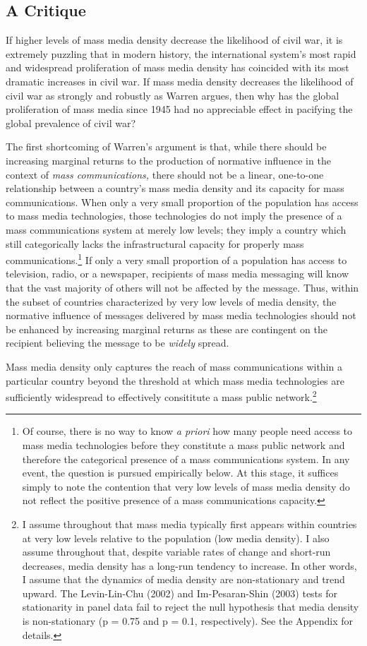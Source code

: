 \documentclass[11pt,article,oneside]{memoir}
\begin{document}
\subsection{A Critique}\label{a-critique}

If higher levels of mass media density decrease the likelihood of civil
war, it is extremely puzzling that in modern history, the international
system's most rapid and widespread proliferation of mass media density
has coincided with its most dramatic increases in civil war. If mass
media density decreases the likelihood of civil war as strongly and
robustly as Warren argues, then why has the global proliferation of mass
media since 1945 had no appreciable effect in pacifying the global
prevalence of civil war?

The first shortcoming of Warren's argument is that, while there should
be increasing marginal returns to the production of normative influence
in the context of \emph{mass communications,} there should not be a
linear, one-to-one relationship between a country's mass media density
and its capacity for mass communications. When only a very small
proportion of the population has access to mass media technologies,
those technologies do not imply the presence of a mass communications
system at merely low levels; they imply a country which still
categorically lacks the infrastructural capacity for properly mass
communications.\footnote{Of course, there is no way to know \emph{a
  priori} how many people need access to mass media technologies before
  they constitute a mass public network and therefore the categorical
  presence of a mass communications system. In any event, the question
  is pursued empirically below. At this stage, it suffices simply to
  note the contention that very low levels of mass media density do not
  reflect the positive presence of a mass communications capacity.} If
only a very small proportion of a population has access to television,
radio, or a newspaper, recipients of mass media messaging will know that
the vast majority of others will not be affected by the message. Thus,
within the subset of countries characterized by very low levels of media
density, the normative influence of messages delivered by mass media
technologies should not be enhanced by increasing marginal returns as
these are contingent on the recipient believing the message to be
\emph{widely} spread.

Mass media density only captures the reach of mass communications within
a particular country beyond the threshold at which mass media
technologies are sufficiently widespread to effectively consititute a
mass public network.\footnote{I assume throughout that mass media
  typically first appears within countries at very low levels relative
  to the population (low media density). I also assume throughout that,
  despite variable rates of change and short-run decreases, media
  density has a long-run tendency to increase. In other words, I assume
  that the dynamics of media density are non-stationary and trend
  upward. The Levin-Lin-Chu (2002) and Im-Pesaran-Shin (2003) tests for
  stationarity in panel data fail to reject the null hypothesis that
  media density is non-stationary (p = 0.75 and p = 0.1, respectively).
  See the Appendix for details.}
\end{document}
